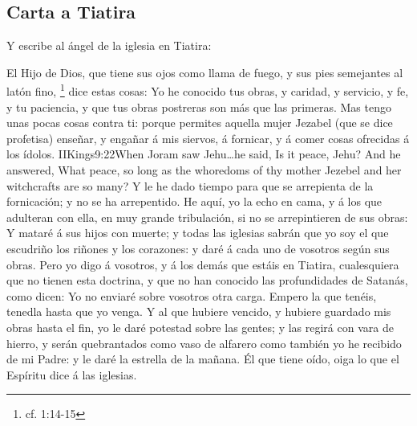 \subsection*{Carta a Tiatira}
Y escribe al ángel de la iglesia en Tiatira:

El Hijo de Dios, que tiene sus ojos como llama de fuego, y sus pies semejantes al latón fino,%
	\footnote{cf. 1:14-15} %
dice estas cosas:
Yo he conocido tus obras, y caridad, y servicio, y fe, y tu paciencia, y que tus obras postreras son más que las primeras. %
Mas tengo unas pocas cosas contra ti: porque permites aquella mujer Jezabel (que se dice profetisa) enseñar, y engañar á mis siervos, á fornicar, y á comer cosas ofrecidas á los ídolos.%
				 {IIKings}{9:22}{When Joram saw Jehu\ldots he said, Is it peace, Jehu? And he answered, What peace, so long as the whoredoms of thy mother Jezebel and her witchcrafts are so many?}
Y le he dado tiempo para que se arrepienta de la fornicación; y no se ha arrepentido. %
He aquí, yo la echo en cama, y á los que adulteran con ella, en muy grande tribulación, si no se arrepintieren de sus obras: %
Y mataré á sus hijos con muerte; y todas las iglesias sabrán que yo soy el que escudriño los riñones y los corazones:%
 y daré á cada uno de vosotros según sus obras. %
Pero yo digo á vosotros, y á los demás que estáis en Tiatira, cualesquiera que no tienen esta doctrina, y que no han conocido las profundidades de Satanás, como dicen: Yo no enviaré sobre vosotros otra carga. %
Empero la que tenéis, tenedla hasta que yo venga. %
Y al que hubiere vencido, y hubiere guardado mis obras hasta el fin, yo le daré potestad sobre las gentes; %
y las regirá con vara de hierro, y serán quebrantados como vaso de alfarero%
 como también yo he recibido de mi Padre: %
y le daré la estrella de la mañana. %
Él que tiene oído, oiga lo que el Espíritu dice á las iglesias.
